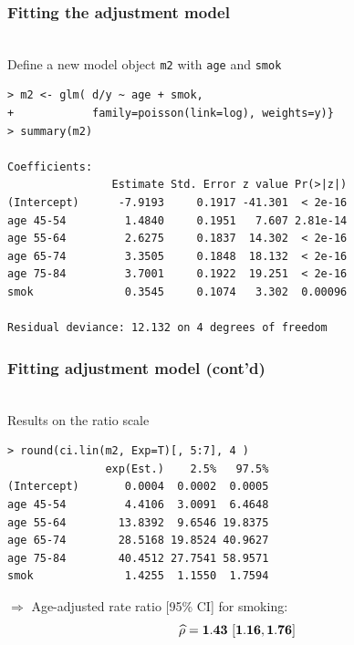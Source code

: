 \documentclass[handout, 12pt]{beamer}
\begin{document}

\begin{frame}[fragile] \frametitle{Fitting the adjustment model} 
\ \\
Define a new model object {\tt m2} with {\tt age} and {\tt smok}
\small
\begin{verbatim}
> m2 <- glm( d/y ~ age + smok,
+            family=poisson(link=log), weights=y)}
> summary(m2)

Coefficients:            
                Estimate Std. Error z value Pr(>|z|)
(Intercept)      -7.9193     0.1917 -41.301  < 2e-16
age 45-54         1.4840     0.1951   7.607 2.81e-14
age 55-64         2.6275     0.1837  14.302  < 2e-16
age 65-74         3.3505     0.1848  18.132  < 2e-16
age 75-84         3.7001     0.1922  19.251  < 2e-16
smok              0.3545     0.1074   3.302  0.00096

Residual deviance: 12.132 on 4 degrees of freedom
\end{verbatim}\normalsize
\end{frame} 


\begin{frame}[fragile] \frametitle{Fitting adjustment model (cont'd)}
\ \\
Results on the ratio scale
\begin{verbatim}
> round(ci.lin(m2, Exp=T)[, 5:7], 4 )
               exp(Est.)    2.5%   97.5%
(Intercept)       0.0004  0.0002  0.0005
age 45-54         4.4106  3.0091  6.4648
age 55-64        13.8392  9.6546 19.8375
age 65-74        28.5168 19.8524 40.9627
age 75-84        40.4512 27.7541 58.9571
smok              1.4255  1.1550  1.7594
\end{verbatim}

$\Rightarrow$ Age-adjusted rate ratio [95\% CI] for smoking:
$$\widehat \rho = {\bf 1.43} \ [{\bf 1.16}, {\bf 1.76}]$$

\end{frame} 

\end{document}

